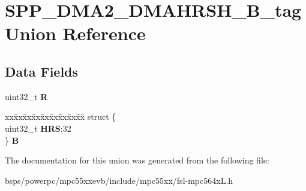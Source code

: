 \hypertarget{unionSPP__DMA2__DMAHRSH__32B__tag}{}\section{S\+P\+P\+\_\+\+D\+M\+A2\+\_\+\+D\+M\+A\+H\+R\+S\+H\+\_\+B\+\_\+tag Union Reference}
\label{unionSPP__DMA2__DMAHRSH__32B__tag}
\subsection*{Data Fields}
\begin{DoxyCompactItemize}
\item 
\mbox{\label{unionSPP__DMA2__DMAHRSH__32B__tag_a78077b275130b81adedc0c596a8cb47b}} 
uint32\+\_\+t {\bfseries R}
\item 
\mbox{\label{unionSPP__DMA2__DMAHRSH__32B__tag_ae23c26bcf422f81e411fffd7b446a126}} 
\begin{tabbing}
xx\=xx\=xx\=xx\=xx\=xx\=xx\=xx\=xx\=\kill
struct \{\\
\>uint32\_t {\bfseries HRS}:32\\
\} {\bfseries B}\\

\end{tabbing}\end{DoxyCompactItemize}


The documentation for this union was generated from the following file\+:\begin{DoxyCompactItemize}
\item 
bsps/powerpc/mpc55xxevb/include/mpc55xx/fsl-\/mpc564x\+L.\+h\end{DoxyCompactItemize}

